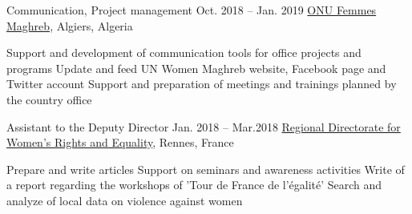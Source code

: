 \begin{joblist}[13.2][7.8][3.4]
\item[Communication, Project management]{Oct. 2018 -- Jan. 2019 }     
	{
	\href{http://maghreb.unwomen.org/fr}{ONU Femmes Maghreb}, Algiers, Algeria
	}     
	{
			 
		\vspace{-0.5cm}
		\begin{itemize}
			  \iftbftiny \setlength\itemsep{-3pt} \fi
			  \cvitem[\checkmark] Support and development of communication tools for office projects and programs     
 			  \cvitem[\checkmark] Update and feed UN Women Maghreb website, Facebook page and Twitter account                                                         
			  \cvitem[\checkmark] Support and preparation of meetings and trainings planned by the country office
		\end{itemize}      

	}

\item[Assistant to the Deputy Director]{Jan. 2018 -- Mar.2018 }     
  	{
	\href{https://www.egalite-femmes-hommes.gouv.fr/le-secretariat-d-etat/organisation-du-ministere/services-territoriaux/annuaire-des-equipes-regionales-et-departementales/}{Regional Directorate for Women's Rights and Equality}, Rennes, France
	}      
  	{
        \vspace{-0.5cm}
		\iftbftiny \setlength{\parskip}{-10pt} \fi
		\begin{itemize}
			  \iftbftiny \setlength\itemsep{-3pt} \fi
			  \cvitem[\checkmark] Prepare and write articles
			  \cvitem[\checkmark] Support on seminars and awareness activities
			  \cvitem[\checkmark] Write of a report regarding the workshops of 'Tour de France de l'égalité'
			  \cvitem[\checkmark] Search and analyze of local data on violence against women
		\end{itemize}       
	}



\end{joblist}
